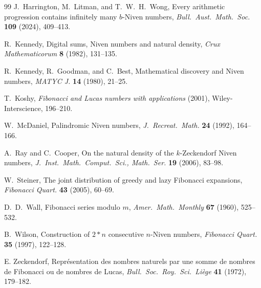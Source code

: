 \documentclass[12pt]{article}
\theoremstyle{definition}
\begin{document}
\begin{thebibliography}{99}
J.~Harrington, M.~Litman, and T.~W.~H.~Wong, Every arithmetic progression contains infinitely many $b$-Niven numbers, \textit{Bull.\ Aust.\ Math.\ Soc.\/} \textbf{109} (2024), 409--413.

R.~Kennedy, Digital sums, Niven numbers and natural density, \textit{Crux Mathematicorum} \textbf{8} (1982), 131--135.

R.~Kennedy, R.~Goodman, and C.~Best,  Mathematical discovery and Niven numbers, \textit{MATYC J.\/} \textbf{14} (1980), 21--25.

T.~Koshy, \textit{Fibonacci and Lucas numbers with applications} (2001), Wiley-Interscience, 196--210.

W.~McDaniel, Palindromic Niven numbers, \textit{J.\ Recreat.\ Math.\/} \textbf{24} (1992), 164--166.

A.~Ray and C.~Cooper, On the natural density of the $k$-Zeckendorf Niven numbers, \textit{J.\ Inst.\ Math.\ Comput.\ Sci., Math.\ Ser.\/} \textbf{19} (2006), 83--98.

W.~Steiner, The joint distribution of greedy and lazy Fibonacci expansions, \textit{Fibonacci Quart.\/} \textbf{43} (2005), 60--69.

D.~D.~Wall, Fibonacci series modulo $m$, \textit{Amer.\ Math.\ Monthly} \textbf{67} (1960), 525--532.

B.~Wilson, Construction of $2*n$ consecutive $n$-Niven numbers, \textit{Fibonacci Quart.\/} \textbf{35} (1997), 122--128.

E. Zeckendorf, Repr\'{e}sentation des nombres naturels par une somme de nombres de Fibonacci ou de nombres de Lucas, \textit{Bull.\ Soc.\ Roy.\ Sci.\ Li\`{e}ge} \textbf{41} (1972), 179--182.
\end{thebibliography}
\end{document}

